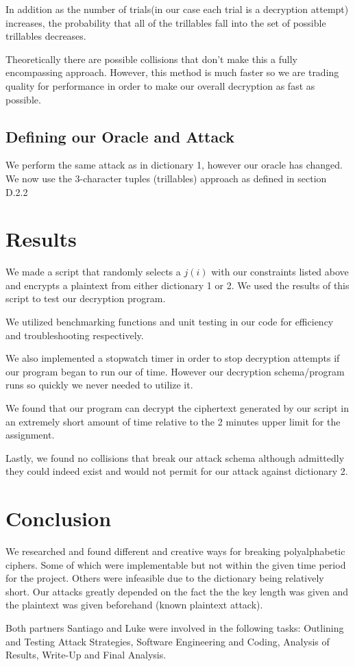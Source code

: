 \documentclass[pdftex,12pt,letter]{article}
\begin{document}
In addition as the number of trials(in our case each trial is a decryption attempt) 
increases, the probability that all of the trillables fall into the set of possible trillables 
decreases.  

Theoretically there are possible collisions that don't make this a fully encompassing approach. 
However, this method is much faster so we are trading quality for performance in order to make 
our overall decryption as fast as possible.

\subsection{Defining our Oracle and Attack} 
We perform the same attack as in dictionary 1, however our oracle has changed. 
We now use the 3-character tuples (trillables) approach as defined in section D.2.2 
 

\section{Results}
We made a script that randomly selects a $j(i)$ with our constraints listed above and 
encrypts a plaintext from either dictionary 1 or 2. We used the results of this script 
to test our decryption program.  

We utilized benchmarking functions and unit testing in our code for efficiency 
and troubleshooting respectively. 

We also implemented a stopwatch timer in order to stop decryption attempts if 
our program began to run our of time. However our decryption schema/program runs 
so quickly we never needed to utilize it. 

We found that our program can decrypt the ciphertext generated by our script in 
an extremely short amount of time relative to the 2 minutes upper limit for the 
assignment. 

Lastly, we found no collisions that break our attack schema although admittedly 
they could indeed exist and would not permit for our attack against dictionary 2. 
 
\section{Conclusion}
We researched and found different and creative ways for breaking polyalphabetic ciphers.
Some of which were implementable but not within the given time period for the project.
Others were infeasible due to the dictionary being relatively short. Our attacks 
greatly depended on the fact the the key length was given and the plaintext was
given beforehand (known plaintext attack).

Both partners Santiago and Luke were involved in the following tasks: 
Outlining and Testing  Attack Strategies, Software Engineering and Coding, Analysis of Results, 
Write-Up and Final Analysis.
\end{document}
